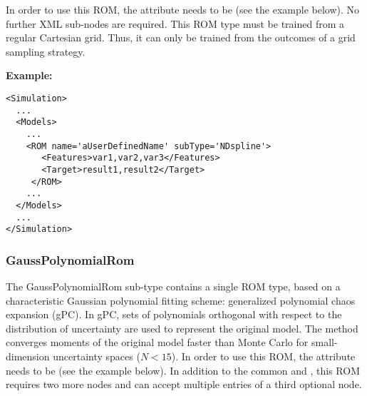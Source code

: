 In order to use this ROM, the  attribute  needs to
be  (see the example below).
%
No further XML sub-nodes are required.
%
\nb This ROM type must be trained from a regular Cartesian grid.
%
Thus, it can only be trained from the outcomes of a grid sampling strategy.

\textbf{Example:}
\begin{lstlisting}[style=XML,morekeywords={name,subType}]
<Simulation>
  ...
  <Models>
    ...
    <ROM name='aUserDefinedName' subType='NDspline'>
       <Features>var1,var2,var3</Features>
       <Target>result1,result2</Target>
     </ROM>
    ...
  </Models>
  ...
</Simulation>
\end{lstlisting}

\subsubsection{GaussPolynomialRom}
\label{subsubsec:GaussPolynomialRom}
The GaussPolynomialRom sub-type contains a single ROM type, based on a 
characteristic Gaussian polynomial fitting scheme: generalized polynomial chaos
expansion (gPC).
%
In gPC, sets of polynomials orthogonal with respect to the distribution of uncertainty 
are used to represent the original model.  The method converges moments of the original
model faster than Monte Carlo for small-dimension uncertainty spaces ($N<15$).
%
In order to use this ROM, the  attribute  needs to
be  (see the example below).
%
In addition to the common  and , this ROM requires
two more nodes and can accept multiple entries of a third optional node.

